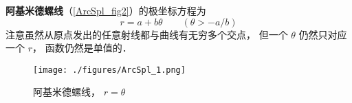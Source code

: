 
\begin{issues}
\issueNeedCite
\issueDraft
\end{issues}


\textbf{阿基米德螺线}（\autoref{ArcSpl_fig2}）的极坐标方程为
\begin{equation}
r = a + b\theta \qquad (\theta > -a/b)
\end{equation}
注意虽然从原点发出的任意射线都与曲线有无穷多个交点， 但一个 $\theta$ 仍然只对应一个 $r$， 函数仍然是单值的．

\begin{figure}[ht]
\centering
\texttt{[image: ./figures/ArcSpl\_1.png]}
\caption{阿基米德螺线， $r = \theta$} \label{ArcSpl_fig2}
\end{figure}
